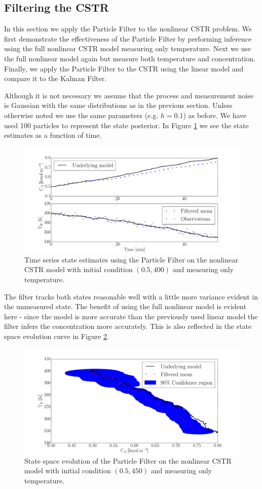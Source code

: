 \documentclass[../masters.tex]{subfiles}
\begin{document}
\subsection{Filtering the CSTR}
In this section we apply the Particle Filter to the nonlinear CSTR problem. We first demonstrate the effectiveness of the Particle Filter by performing inference using the full nonlinear CSTR model measuring only temperature. Next we use the full nonlinear model again but measure both temperature and concentration. Finally, we apply the Particle Filter to the CSTR using the linear model and compare it to the Kalman Filter.

Although it is not necessary we assume that the process and measurement noise is Gaussian with the same distributions as in the previous section. Unless otherwise noted we use the same parameters (e.g. $h=0.1$) as before. We have used 100 particles to represent the state posterior. In Figure \ref{fig_pf_m1_time} we see the state estimates as a function of time.
\begin{figure}[H] 
\centering
\includegraphics[scale=0.30]{pf_m1_time.pdf}
\caption{Time series state estimates using the Particle Filter on the nonlinear CSTR model with initial condition $(0.5, 400)$ and measuring only temperature.}
\label{fig_pf_m1_time}
\end{figure}
The filter tracks both states reasonable well with a little more variance evident in the unmeasured state. The benefit of using the full nonlinear model is evident here - since the model is more accurate than the previously used linear model the filter infers the concentration more accurately. This is also reflected in the state space evolution curve in Figure \ref{fig_pf_m1_phase}.
\begin{figure}[H] 
\centering
\includegraphics[scale=0.30]{pf_m1_phase.pdf}
\caption{State space evolution of the Particle Filter on the nonlinear CSTR model with initial condition $(0.5, 450)$ and measuring only temperature.}
\label{fig_pf_m1_phase}
\end{figure}
\end{document}
